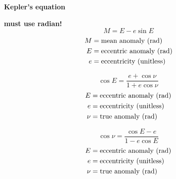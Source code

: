 \documentclass{article}
\begin{document}
\textbf{Kepler's equation}
\begin{multicols}{3}
	\textbf{must use radian!}\\
	\begin{equation*}
	\boxed{M = E - e \sin E}
	\end{equation*}
	\vfill\null
	\columnbreak
	\begin{align*}
	M &= \text{mean anomaly (\si{\radian})}\\
	E &= \text{eccentric anomaly (\si{\radian})}\\
	e &= \text{eccentricity (unitless)}\\
	\end{align*}
\end{multicols}

\begin{multicols}{3}
	\begin{equation*}
	\boxed{\cos E = \dfrac{e + \cos \nu}{1 + e \cos \nu}}
	\end{equation*}
	\vfill\null
	\columnbreak
	\begin{align*}
	E &= \text{eccentric anomaly (\si{\radian})}\\
	e &= \text{eccentricity (unitless)}\\
	\nu &= \text{true anomaly (\si{\radian})}\\
	\end{align*}
\end{multicols}

\begin{multicols}{3}
	\begin{equation*}
	\boxed{\cos \nu = \dfrac{\cos E - e}{1 - e \cos E}}
	\end{equation*}
	\vfill\null
	\columnbreak
	\begin{align*}
	E &= \text{eccentric anomaly (\si{\radian})}\\
	e &= \text{eccentricity (unitless)}\\
	\nu &= \text{true anomaly (\si{\radian})}\\
	\end{align*}
\end{multicols}
\end{document}
